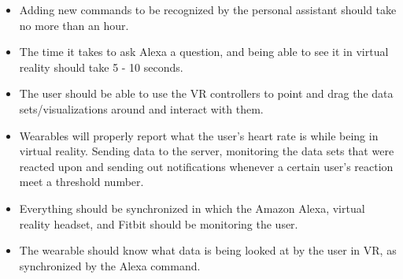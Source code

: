 \documentclass[onecolumn, draftclsnofoot,10pt, compsoc]{IEEEtran}
\begin{document}
\begin{itemize}
\item Adding new commands to be recognized by the personal assistant should take no more than an hour.

\item The time it takes to ask Alexa a question, and being able to see it in virtual reality should take 5 - 10 seconds.

\item The user should be able to use the VR controllers to point and drag the data sets/visualizations around and interact with them.

\item Wearables will properly report what the user’s heart rate is while being in virtual reality. Sending data to the server, monitoring the data sets that were reacted upon and sending out notifications whenever a certain user’s reaction meet a threshold number.

\item Everything should be synchronized in which the Amazon Alexa, virtual reality headset, and Fitbit should be monitoring the user.

\item The wearable should know what data is being looked at by the user in VR, as synchronized by the Alexa command.
\end{itemize}
\end{document}
